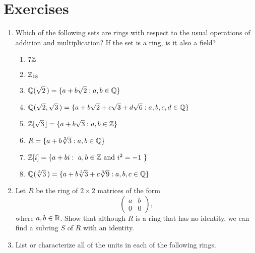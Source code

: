  
 
\section*{Exercises}
\exrule
 
 
{\small
\begin{enumerate}
 
 
\bf\item\rm
Which of the following sets are rings with respect to the usual
operations of addition and multiplication?  If the set is a ring, is
it also a field?
\begin{enumerate}
 
 \bf\item\rm
$7 {\Bbb Z}$
 
 \bf\item\rm
${\Bbb Z}_{18}$
 
 \bf\item\rm
${\Bbb Q} ( \sqrt{2}\, ) = \{a + b \sqrt{2} : a, b \in {\Bbb Q}\}$
 
 \bf\item\rm
${\Bbb Q} ( \sqrt{2}, \sqrt{3}\, ) = \{a + b \sqrt{2} + c \sqrt{3} + d
\sqrt{6} :  a, b, c, d \in {\Bbb Q}\}$
 
 \bf\item\rm
${\Bbb Z}[\sqrt{3}\, ] = \{ a + b \sqrt{3} : a, b \in {\Bbb Z} \}$
 
 \bf\item\rm
$R = \{a + b \sqrt[3]{3} : a, b \in {\Bbb Q} \}$
 
 \bf\item\rm
${\Bbb Z}[ i ] = \{ a + b i :\mbox{ $a, b \in {\Bbb Z}$ and  $i^2 =
-1$ } \}$ 
 
 \bf\item\rm
${\Bbb Q}( \sqrt[3]{3}\, ) = \{ a + b \sqrt[3]{3} + c \sqrt[3]{9} : a, b,
c \in {\Bbb Q} \}$ 
 
\end{enumerate}
 
 
\bf\item\rm
Let $R$ be the ring of $2 \times 2$ matrices of the form
\[
\left(
\begin{array}{cc}
a & b \\
0 & 0
\end{array}
\right),
\]
where $a, b \in {\Bbb R}$.  Show that although $R$ is a ring that has no
identity, we can find a subring $S$ of $R$ with an identity.
 
 
\bf\item\rm
List or characterize all of the units in each of the following rings.
\begin{enumerate}
 

\end{enumerate}
\end{enumerate}}
